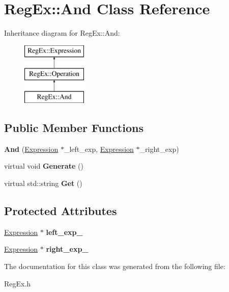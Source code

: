\hypertarget{class_reg_ex_1_1_and}{}\section{Reg\+Ex\+:\+:And Class Reference}
\label{class_reg_ex_1_1_and}
Inheritance diagram for Reg\+Ex\+:\+:And\+:\begin{figure}[H]
\begin{center}
\leavevmode
\includegraphics[height=3.000000cm]{class_reg_ex_1_1_and}
\end{center}
\end{figure}
\subsection*{Public Member Functions}
\begin{DoxyCompactItemize}
\item 
\mbox{\label{class_reg_ex_1_1_and_a8810ebb2d7c45cef6246c4d019b18940}} 
{\bfseries And} (\hyperlink{class_reg_ex_1_1_expression}{Expression} $\ast$\+\_\+left\+\_\+exp, \hyperlink{class_reg_ex_1_1_expression}{Expression} $\ast$\+\_\+right\+\_\+exp)
\item 
\mbox{\label{class_reg_ex_1_1_and_aeeb03347f3cf64d4313c49cf7df6edb8}} 
virtual void {\bfseries Generate} ()
\item 
\mbox{\label{class_reg_ex_1_1_and_ae95a8c127ce73d9c595b7b3d9b63020d}} 
virtual std\+::string {\bfseries Get} ()
\end{DoxyCompactItemize}
\subsection*{Protected Attributes}
\begin{DoxyCompactItemize}
\item 
\mbox{\label{class_reg_ex_1_1_and_ad523d9b208f99483a5f53471c32b6a37}} 
\hyperlink{class_reg_ex_1_1_expression}{Expression} $\ast$ {\bfseries left\+\_\+exp\+\_\+}
\item 
\mbox{\label{class_reg_ex_1_1_and_a0fa312b1550769293a5f68b1d05fb645}} 
\hyperlink{class_reg_ex_1_1_expression}{Expression} $\ast$ {\bfseries right\+\_\+exp\+\_\+}
\end{DoxyCompactItemize}


The documentation for this class was generated from the following file\+:\begin{DoxyCompactItemize}
\item 
Reg\+Ex.\+h\end{DoxyCompactItemize}
